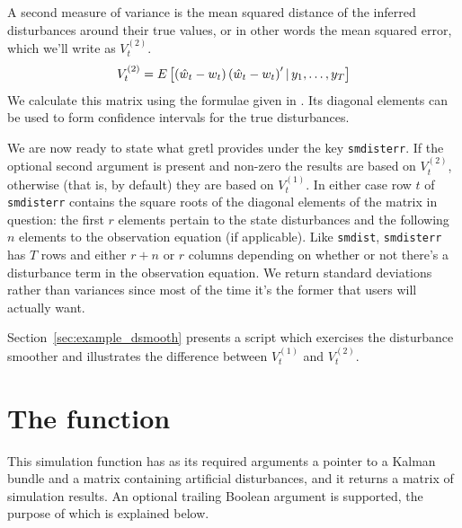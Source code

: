 A second measure of variance is the mean squared distance of the
inferred disturbances around their true values, or in other words the
mean squared error, which we'll write as $V^{(2)}_t$.
\[
V^{(2)}_t = E\left[\left(\hat{w}_t - w_t\right)
  \left(\hat{w}_t - w_t\right)'
  | \,y_1, \ldots, y_T \right]
\] 
We calculate this matrix using the formulae given in \citet[section
4.5.2]{durbin-koopman12}. Its diagonal elements can be used to form
confidence intervals for the true disturbances.

We are now ready to state what gretl provides under the key
\texttt{smdisterr}. If the optional second argument is present and
non-zero the results are based on $V^{(2)}_t$, otherwise (that is, by
default) they are based on $V^{(1)}_t$. In either case row $t$ of
\texttt{smdisterr} contains the square roots of the diagonal elements
of the matrix in question: the first $r$ elements pertain to the state
disturbances and the following $n$ elements to the observation
equation (if applicable). Like \texttt{smdist}, \texttt{smdisterr} has
$T$ rows and either $r+n$ or $r$ columns depending on whether or not
there's a disturbance term in the observation equation. We return
standard deviations rather than variances since most of the time
it's the former that users will actually want.

Section~\ref{sec:example_dsmooth} presents a script which exercises
the disturbance smoother and illustrates the difference between
$V^{(1)}_t$ and $V^{(2)}_t$.


\section{The  function}
\label{sec:ksimul}

This simulation function has as its required arguments a pointer to a
Kalman bundle and a matrix containing artificial disturbances, and it
returns a matrix of simulation results. An optional trailing Boolean
argument is supported, the purpose of which is explained below.

